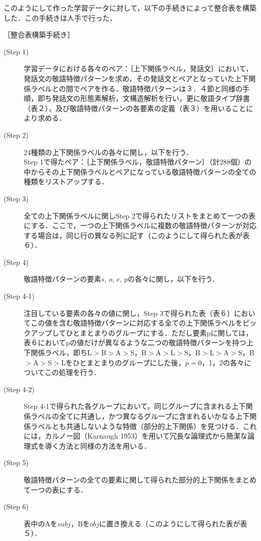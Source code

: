 このようにして作った学習データに対して，以下の手続きによって整合表を構築した．この手続きは人手で行った．

\bigskip

［整合表構築手続き］
\begin{description}
\item[(Step 1)]学習データにおける各々のペア：｛上下関係ラベル，発話文｝において，発話文の敬語特徴パターンを求め，その発話文とペアとなっていた上下関係ラベルとの間でペアを作る．敬語特徴パターンは３．４節と同様の手順，即ち発話文の形態素解析，文構造解析を行い，更に敬語タイプ辞書（表２），及び敬語特徴パターンの各要素の定義（表３）を用いることにより求める．
\item[(Step 2)]24種類の上下関係ラベルの各々に関し，以下を行う．\\
Step 1で得たペア：｛上下関係ラベル，敬語特徴パターン｝（計288個）の中からその上下関係ラベルとペアになっている敬語特徴パターンの全ての種類をリストアップする．
\item[(Step 3)]全ての上下関係ラベルに関しStep 2で得られたリストをまとめて一つの表にする．ここで，一つの上下関係ラベルに複数の敬語特徴パターンが対応する場合は，同じ行の異なる列に記す（このようにして得られた表が表６）．
\item[(Step 4)]敬語特徴パターンの要素$s$, $o$, $e$, $p$の各々に関し，以下を行う．
\item[(Step 4-1)]注目している要素の各々の値に関し，Step 3で得られた表（表６）においてこの値を含む敬語特徴パターンに対応する全ての上下関係ラベルをピックアップしてひとまとまりのグループにする．ただし要素pに関しては，表６においてpの値だけが異なるような二つの敬語特徴パターンを持つ上下関係ラベル，即ちL$>$B$>$A$>$S，B$>$A$>$L$>$S，B$>$L$>$A$>$S，B$>$A$>$S$>$Lをひとまとまりのグループにした後，$p=$0，1，2の各々についてこの処理を行う．
\item[(Step 4-2)]Step 4-1で得られた各グループにおいて，同じグループに含まれる上下関係ラベルの全てに共通し，かつ異なるグループに含まれるいかなる上下関係ラベルとも共通しないような特徴（部分的上下関係）を見つける．これには，カルノー図（Karnaugh 1953）を用いて冗長な論理式から簡潔な論理式を導く方法と同様の方法を用いる．
\item[(Step 5)]敬語特徴パターンの全ての要素に関して得られた部分的上下関係をまとめて一つの表にする．
\item[(Step 6)]表中のAを$subj$，Bを$obj$に置き換える（このようにして得られた表が表５）．
\end{description}

